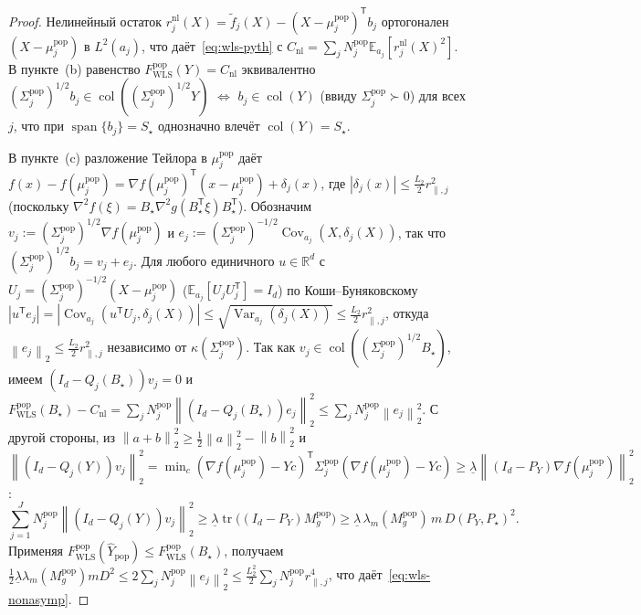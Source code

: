 \documentclass[11pt,a4paper]{article}
\numberwithin{equation}{section}
\theoremstyle{definition}
\theoremstyle{remark}
\newcommand{\R}{\mathbb{R}}
\newcommand{\E}{\mathbb{E}}
\newcommand{\Cov}{\operatorname{Cov}}
\newcommand{\Var}{\operatorname{Var}}
\newcommand{\tr}{\operatorname{tr}}
\newcommand{\col}{\operatorname{col}}
\newcommand{\T}{^{\mathsf T}}
\newcommand{\norm}[1]{\left\lVert #1 \right\rVert}
\begin{document}
\begin{proof}
Нелинейный остаток $r_j^{\mathrm{nl}}(X) = \tilde{f}_j(X) - (X-\mu_j^{\mathrm{pop}})\T b_j$ ортогонален
$(X-\mu_j^{\mathrm{pop}})$ в $L^2(a_j)$, что даёт~\eqref{eq:wls-pyth} с $C_{\mathrm{nl}} = \sum_j N_j^{\mathrm{pop}} \E_{a_j}[r_j^{\mathrm{nl}}(X)^2]$.
В пункте~(b) равенство $F_{\mathrm{WLS}}^{\mathrm{pop}}(Y) = C_{\mathrm{nl}}$ эквивалентно
$(\Sigma_j^{\mathrm{pop}})^{1/2} b_j \in \col((\Sigma_j^{\mathrm{pop}})^{1/2} Y)$ $\iff$ $b_j \in \col(Y)$
(ввиду $\Sigma_j^{\mathrm{pop}} \succ 0$) для всех $j$, что при $\operatorname{span}\{b_j\} = S_\star$
однозначно влечёт $\col(Y) = S_\star$.

В пункте~(c) разложение Тейлора в $\mu_j^{\mathrm{pop}}$ даёт
$f(x) - f(\mu_j^{\mathrm{pop}}) = \nabla f(\mu_j^{\mathrm{pop}})\T(x - \mu_j^{\mathrm{pop}}) + \delta_j(x)$,
где $|\delta_j(x)| \le \frac{L_2}{2} r_{\parallel, j}^2$ (поскольку $\nabla^2 f(\xi) = B_\star \nabla^2 g(B_\star\T \xi) B_\star\T$).
Обозначим $v_j := (\Sigma_j^{\mathrm{pop}})^{1/2} \nabla f(\mu_j^{\mathrm{pop}})$ и
$e_j := (\Sigma_j^{\mathrm{pop}})^{-1/2} \Cov_{a_j}(X, \delta_j(X))$, так что $(\Sigma_j^{\mathrm{pop}})^{1/2} b_j = v_j + e_j$.
Для любого единичного $u \in \R^d$ с $U_j = (\Sigma_j^{\mathrm{pop}})^{-1/2}(X - \mu_j^{\mathrm{pop}})$
($\E_{a_j}[U_j U_j\T] = I_d$) по Коши--Буняковскому
$|u\T e_j| = |\Cov_{a_j}(u\T U_j, \delta_j(X))| \le \sqrt{\Var_{a_j}(\delta_j(X))} \le \frac{L_2}{2} r_{\parallel, j}^2$,
откуда $\norm{e_j}_2 \le \frac{L_2}{2} r_{\parallel, j}^2$ независимо от $\kappa(\Sigma_j^{\mathrm{pop}})$.
Так как $v_j \in \col((\Sigma_j^{\mathrm{pop}})^{1/2} B_\star)$, имеем $(I_d - Q_j(B_\star)) v_j = 0$ и
$F_{\mathrm{WLS}}^{\mathrm{pop}}(B_\star) - C_{\mathrm{nl}} = \sum_j N_j^{\mathrm{pop}} \norm{(I_d - Q_j(B_\star)) e_j}_2^2 \le \sum_j N_j^{\mathrm{pop}} \norm{e_j}_2^2$.
С другой стороны, из $\norm{a + b}_2^2 \ge \frac{1}{2}\norm{a}_2^2 - \norm{b}_2^2$ и
$\norm{(I_d - Q_j(Y)) v_j}_2^2 = \min_c (\nabla f(\mu_j^{\mathrm{pop}}) - Y c)\T \Sigma_j^{\mathrm{pop}}(\nabla f(\mu_j^{\mathrm{pop}}) - Y c)
\ge \underline{\lambda} \norm{(I_d - P_Y)\nabla f(\mu_j^{\mathrm{pop}})}_2^2$:
\[
  \sum_{j=1}^J N_j^{\mathrm{pop}} \norm{(I_d - Q_j(Y)) v_j}_2^2
  \ge \underline{\lambda} \tr\!\bigl((I_d - P_Y) M_g^{\mathrm{pop}}\bigr)
  \ge \underline{\lambda}\, \lambda_m(M_g^{\mathrm{pop}})\, m\, D(P_Y, P_\star)^2.
\]
Применяя $F_{\mathrm{WLS}}^{\mathrm{pop}}(\widehat{Y}_{\mathrm{pop}}) \le F_{\mathrm{WLS}}^{\mathrm{pop}}(B_\star)$,
получаем $\frac{1}{2}\underline{\lambda}\lambda_m(M_g^{\mathrm{pop}}) m D^2 \le 2 \sum_j N_j^{\mathrm{pop}} \norm{e_j}_2^2
\le \frac{L_2^2}{2}\sum_j N_j^{\mathrm{pop}} r_{\parallel, j}^4$, что даёт~\eqref{eq:wls-nonasymp}.
\end{proof}
\end{document}
